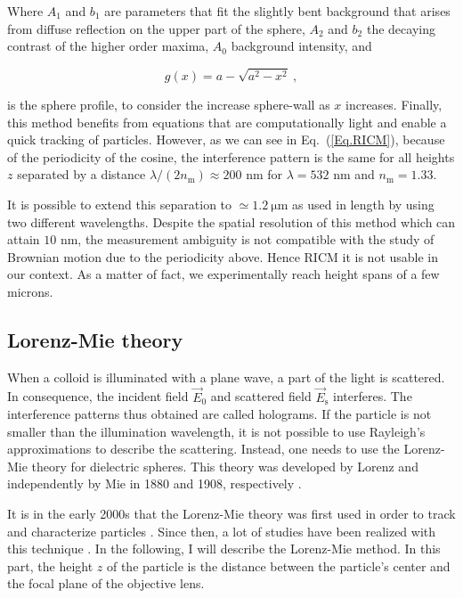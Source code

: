 Where $A_1$ and $b_1$ are parameters \cite{raedler_measurement_1992} that fit the slightly bent background that arises from diffuse reflection on the upper part of the sphere, $A_2$ and $b_2$ the decaying contrast of the higher order maxima, $A_0$ background intensity, and

\begin{equation}
	g(x) = a - \sqrt{a^2 - x^2} ~,
\end{equation}

is the sphere profile, to consider  the increase sphere-wall as $x$ increases.
Finally, this method benefits from equations that are computationally light and enable a quick tracking of particles. However, as we can see in Eq.~(\ref{Eq.RICM}), because of the periodicity of the cosine, the interference pattern is the same for all heights $z$ separated by a distance $\lambda / (2n_\mathrm{m}) \approx 200 $ nm for $\lambda = 532$ nm and $n_{\mathrm{m}} = 1.33$. 

It is possible to extend this separation to $\simeq 1.2 ~ \mathrm{\mu m}$ as used in \cite{davies_elastohydrodynamic_2018} length by using two different wavelengths. Despite the spatial resolution of this method which can attain $10$ nm, the measurement ambiguity is not compatible with the study of Brownian motion due to the periodicity above. Hence \gls{RICM} it is not usable in our context. As a matter of fact, we experimentally reach height spans of a few microns. 




\subsection{Lorenz-Mie theory}
\label{chap:LM_fit}

When a colloid is illuminated with a plane wave, a part of the light is scattered. In consequence, the incident field $\vec{E}_0$ and scattered field $\vec{E}_\mathrm{s}$ interferes. The interference patterns thus obtained are called holograms. If the particle is not smaller than the illumination wavelength, it is not possible to use Rayleigh's approximations \cite{strutt_lviii_1871} to describe the scattering. Instead, one needs to use the Lorenz-Mie theory for dielectric spheres. This theory was developed by Lorenz and independently by Mie in 1880 and 1908, respectively \cite{lorenz_lysbevaegelsen_1890, mie_beitrage_1908}. 

It is in the early 2000s that the Lorenz-Mie theory was first used in order to track and characterize particles \cite{ovryn_imaging_2000, lee_characterizing_2007}. Since then, a lot of studies have been realized with this technique \cite{katz_applications_2010}. In the following, I will describe the Lorenz-Mie method. In this part, the height $z$ of the particle is the distance between the particle's center and the focal plane of the objective lens.

